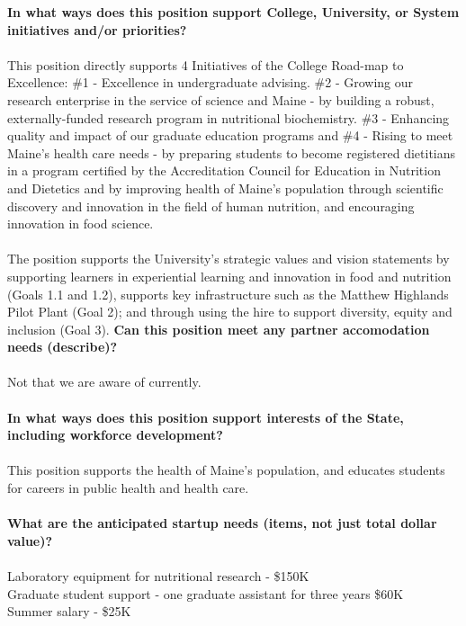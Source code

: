 \documentclass[11pt]{article}
\begin{document}
\vfill
\newpage
\noindent\textbf{\rmfamily In what ways does this position support College, University, or System initiatives and/or priorities?}
\\~\\
This position directly supports 4 Initiatives of the College Road-map to Excellence: \#1 - Excellence in undergraduate advising.
\#2 - Growing our research enterprise in the service of science and Maine - by building a robust, externally-funded research program in nutritional biochemistry. \#3 - Enhancing quality and impact of our graduate education programs and \#4 -  Rising to meet Maine's health care needs - by preparing students to become registered dietitians in a program certified by the Accreditation Council for Education in Nutrition and Dietetics and by improving health of Maine's population through scientific discovery and innovation in the field of human nutrition, and encouraging innovation in food science.  \\~\\The position supports the University's strategic values and vision statements by supporting learners in experiential learning and innovation in food and nutrition (Goals 1.1 and 1.2), supports key infrastructure such as the Matthew Highlands Pilot Plant (Goal 2); and through using the hire to support diversity, equity and inclusion (Goal 3).
\vfill
\noindent\textbf{\rmfamily Can this position meet any partner accomodation needs (describe)?}
\\~\\Not that we are aware of currently.\\~\\
\vfill
\noindent\textbf{\rmfamily In what ways does this position support interests of the State, including workforce development?}\\~\\
This position supports the health of Maine's population, and educates students for careers in public health and health care.
\\~\\
\vfill
\newpage\noindent\textbf{\rmfamily What are the anticipated startup needs (items, not just total dollar value)?}\\~\\
Laboratory equipment for nutritional research - \$150K \\
Graduate student support - one graduate assistant for three years \$60K\\
Summer salary - \$25K\\~\\
\end{document}
